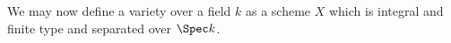 We may now define a variety over a field $k$ as a scheme $X$ which is
integral and finite type and separated over $\Spec k$.
